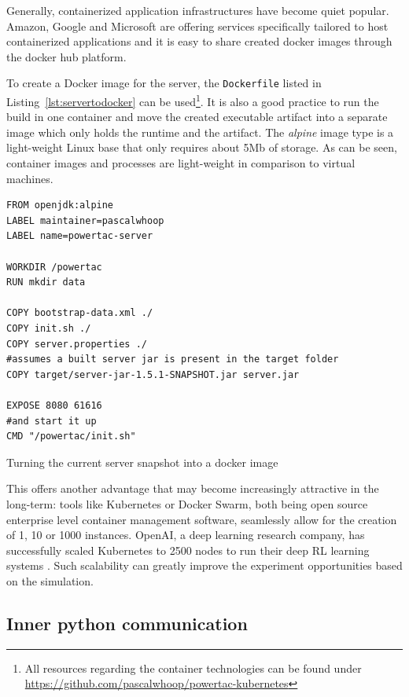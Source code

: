 Generally, containerized application infrastructures have become quiet popular. Amazon, Google and Microsoft are offering
services specifically tailored to host containerized applications and it is easy to share created docker images
through the docker hub platform.

To create a Docker image for the server, the \texttt{Dockerfile} listed in Listing~\ref{lst:servertodocker} can be
used\footnote{All resources regarding the container technologies can be found under
\url{https://github.com/pascalwhoop/powertac-kubernetes}}.
It is also a good practice to run the build in one container and move the created executable artifact into a separate
image which only holds the runtime and the artifact. The \emph{alpine} image type is a light-weight Linux base that
only requires about 5Mb of storage. As can be seen, container images and processes are light-weight in
comparison to virtual machines.

\begin{listing}[h]

    \begin{verbatim}
FROM openjdk:alpine
LABEL maintainer=pascalwhoop
LABEL name=powertac-server

WORKDIR /powertac
RUN mkdir data

COPY bootstrap-data.xml ./
COPY init.sh ./
COPY server.properties ./
#assumes a built server jar is present in the target folder
COPY target/server-jar-1.5.1-SNAPSHOT.jar server.jar

EXPOSE 8080 61616
#and start it up
CMD "/powertac/init.sh"
    \end{verbatim}
    \caption{Turning the current server snapshot into a docker image}
    \label{lst:servertodocker}
\end{listing}

This offers another advantage that may become increasingly attractive in the long-term: tools like Kubernetes or Docker
Swarm, both being open source enterprise level container management software, seamlessly allow for the creation of 1, 10
or 1000 instances. OpenAI, a deep learning research company, has successfully scaled Kubernetes to 2500 nodes to run
their deep \ac{RL} learning systems \citep{openai2500}. Such scalability can greatly improve the experiment
opportunities based on the simulation.

\subsection{Inner python communication}%
\label{sub:inner_python_communication}

